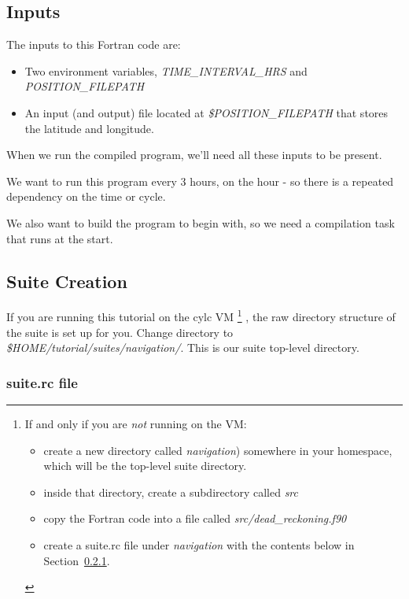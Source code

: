 \subsection{Inputs}

The inputs to this Fortran code are:
\begin{itemize}
    \item Two environment variables, {\em TIME\_INTERVAL\_HRS} and {\em POSITION\_FILEPATH}
    \item An input (and output) file located at {\em \$POSITION\_FILEPATH} that stores the latitude and longitude.
\end{itemize}

When we run the compiled program, we'll need all these inputs to be present.

We want to run this program every 3 hours, on the hour - so there is a repeated dependency on the time or cycle.

We also want to build the program to begin with, so we need a compilation task that runs at the start.

\subsection{Suite Creation}

If you are running this tutorial on the cylc VM \footnote{
    If and only if you are {\em not} running on the VM:
\begin{itemize}
    \item create a new directory called {\em navigation}) somewhere in your homespace, which will be the top-level suite directory.
    \item inside that directory, create a subdirectory called {\em src}
    \item copy the Fortran code into a file called {\em src/dead\_reckoning.f90}
    \item create a suite.rc file under {\em navigation} with the contents below in Section~\ref{Suite Writing suite.rc file}.
\end{itemize}
} , the raw directory structure of the suite is set up for you. Change directory to {\em \$HOME/tutorial/suites/navigation/}. This is our suite top-level directory.

\subsubsection{suite.rc file}
\label{Suite Writing suite.rc file}

